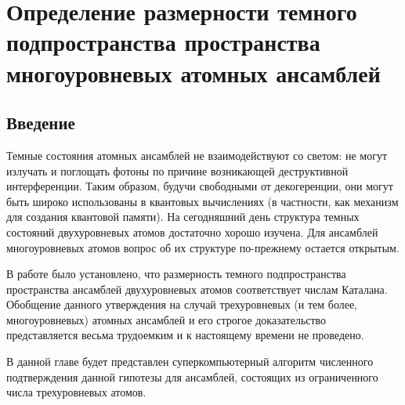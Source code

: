 \chapter{Определение размерности темного подпространства пространства многоуровневых атомных ансамблей}\label{ch:ch4}

\section{Введение}\label{sec:ch4/sect1}

Темные состояния атомных ансамблей не взаимодействуют со светом: не могут излучать и
поглощать фотоны по причине возникающей деструктивной интерференции. Таким образом, будучи свободными от декогеренции, они могут быть широко использованы в квантовых вычислениях (в частности, как механизм для создания квантовой памяти). На сегодняшний день структура темных состояний двухуровневых атомов достаточно хорошо изучена. Для ансамблей многоуровневых атомов вопрос об их структуре по-прежнему остается открытым.

В работе \cite{ozhigov_dimension} было установлено, что размерность темного подпространства пространства ансамблей двухуровневых атомов соответствует числам Каталана. Обобщение данного утверждения на случай трехуровневых (и тем более, многоуровневых) атомных ансамблей и его строгое доказательство представляется весьма трудоемким и к настоящему времени не проведено.

В данной главе будет представлен суперкомпьютерный алгоритм численного подтверждения данной гипотезы для ансамблей, состоящих из ограниченного числа трехуровневых
атомов.


